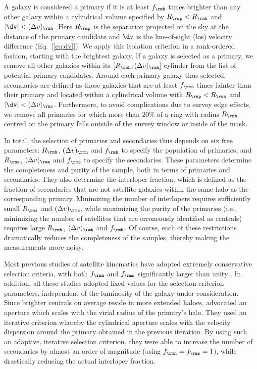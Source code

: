 \documentclass[fleqn,usenatbib,useAMS]{mnras}
\begin{document}
	A galaxy is considered a primary if it is at least $f_\rmh$ times brighter than any other galaxy within a cylindrical volume specified by $R_\rmp < R_\rmh$ and $|\dv | < (\Delta v)_\rmh$. Here $R_\rmp$ is the separation projected on the sky at the distance of the primary candidate and $\dv$ is the line-of-sight (los) velocity difference (Eq.~[\ref{eq:dv}]). We apply this isolation criterion in a rank-ordered fashion, starting with the brightest galaxy. If a galaxy is selected as a primary, we remove all other galaxies within its $[R_\rmh,(\Delta v)_\rmh]$ cylinder from the list of potential primary candidates. Around each primary galaxy thus selected, secondaries are defined as those galaxies that are at least $f_\rms$ times fainter than their primary and located within a cylindrical volume with $R_\rmp < R_\rms$ and $|\dv| < (\Delta v)_\rms$. Furthermore, to avoid complications due to survey edge effects, we remove all primaries for which more than $20\%$ of a ring with radius $R_\rmh$ centred on the primary falls outside of the survey window or inside of the mask.
	
	In total, the selection of primaries and secondaries thus depends on six free parameters: $R_\rmh$, $(\Delta v)_\rmh$ and $f_\rmh$ to specify the population of primaries, and $R_\rms$, $(\Delta v)_\rms$ and $f_\rms$ to specify the secondaries.  These parameters determine the completeness and purity of the sample, both in terms of primaries and secondaries. They also determine the interloper fraction, which is defined as the fraction of secondaries that are not satellite galaxies within the same halo as the corresponding primary. Minimizing the number of interlopers requires sufficiently small $R_\rms$ and $(\Delta v)_\rms$, while maximizing the purity of the primaries (i.e., minimizing the number of satellites that are erroneously identified as centrals) requires large $R_\rmh$, $(\Delta v)_\rmh$ and $f_\rmh$. Of course, each of these restrictions dramatically reduces the completeness of the samples, thereby making the measurements more noisy.
	
	Most previous studies of satellite kinematics have adopted extremely conservative selection criteria, with both $f_\rmh$ and $f_\rms$ significantly larger than unity \citep[e.g.,][]{Zaritsky+93, Zaritsky+97, McKay+02, Brainerd+03, Prada+03, Conroy+07, Norberg+08, Wojtak+13}. In addition, all these studies adopted fixed values for the selection criterion parameters, independent of the luminosity of the galaxy under consideration. Since brighter centrals on average reside in more extended haloes,  \citet{vdBosch+04} advocated an aperture which scales with the virial radius of the primary's halo. They used an iterative criterion whereby the cylindrical aperture scales with the velocity dispersion around the primary obtained in the previous iteration. By using such an adaptive, iterative selection criterion, they were able to increase the number of secondaries by almost an order of magnitude (using $f_\rmh = f_\rms = 1$), while drastically reducing the actual interloper fraction.
	
\end{document}
